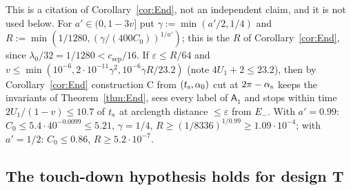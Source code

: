 \begin{remark}\label{rem:T1-cor}
This is a citation of Corollary~\ref{cor:End}, not an independent claim, and it is not used below. For $a'\in(0,1-3v]$ put
$\gamma:=\min(a'/2,1/4)$ and $R:=\min(1/1280,(\gamma/(400C_0))^{1/a'})$; this is the $R$ of Corollary~\ref{cor:End}, since
$\lambda_0/32=1/1280<c_{\mathrm{sep}}/16$. If $\varepsilon\le R/64$ and $v\le\min(10^{-6},2\cdot10^{-11}\gamma^2,10^{-6}\gamma R/23.2)$
(note $4U_1+2\le23.2$), then by Corollary~\ref{cor:End} construction C from $(t_{\mathrm s},\alpha_0)$ cut at $2\pi-\alpha_{\mathrm s}$ keeps the invariants
of Theorem~\ref{thm:End}, sees every label of $\mathsf A_1$ and stops within time $2U_1/(1-v)\le10.7$ of $t_{\mathrm s}$ at arclength distance
$\le\varepsilon$ from $E_-$. With $a'=0.99$: $C_0\le5.4\cdot40^{-0.0099}\le5.21$, $\gamma=1/4$,
$R\ge(1/8336)^{1/0.99}\ge1.09\cdot10^{-4}$; with $a'=1/2$: $C_0\le0.86$, $R\ge5.2\cdot10^{-7}$.
\end{remark}

\subsection{The touch-down hypothesis holds for design T}\label{sec:T1-HT}

